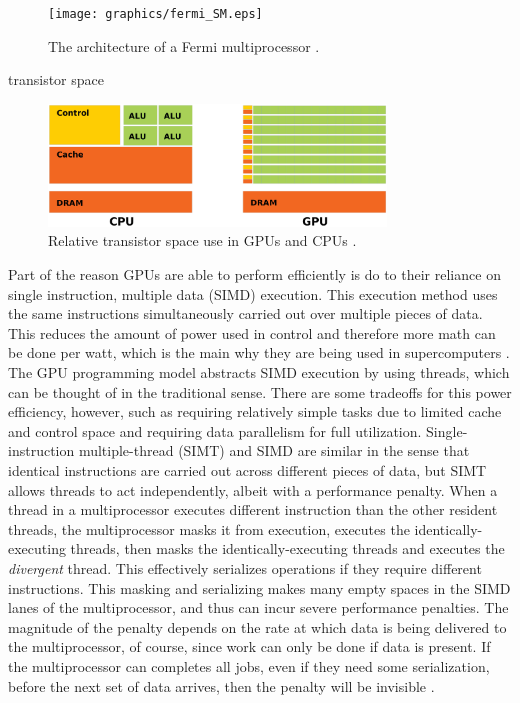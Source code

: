 \begin{figure}[h!] 
  \centering
    \texttt{[image: graphics/fermi\_SM.eps]}
     \caption{The architecture of a Fermi multiprocessor \cite{cuda}. \label{fermi_SM}}
\end{figure}

transistor space

\begin{figure}[h!] 
  \centering
    \includegraphics[width=0.8\textwidth]{graphics/CUDA_transistors.eps}
     \caption{Relative transistor space use in GPUs and CPUs \cite{cuda}. \label{cuda_transistors}}
\end{figure}

Part of the reason GPUs are able to perform efficiently is do to their reliance on single instruction, multiple data (SIMD) execution.  This execution method uses the same instructions simultaneously carried out over multiple pieces of data.  This reduces the amount of power used in control and therefore more math can be done per watt, which is the main why they are being used in supercomputers \cite{exascale}.  The GPU programming model abstracts SIMD execution by using threads, which can be thought of in the traditional sense. There are some tradeoffs for this power efficiency, however, such as requiring relatively simple tasks due to limited cache and control space and requiring data parallelism for full utilization.  Single-instruction multiple-thread (SIMT) and SIMD are similar in the sense that identical instructions are carried out across different pieces of data, but SIMT allows threads to act independently, albeit with a performance penalty.   When a thread in a multiprocessor executes different instruction than the other resident threads, the multiprocessor masks it from execution, executes the identically-executing threads, then masks the identically-executing threads and executes the \emph{divergent} thread.  This effectively serializes operations if they require different instructions.  This masking and serializing makes many empty spaces in the SIMD lanes of the multiprocessor, and thus can incur severe performance penalties.  The magnitude of the penalty depends on the rate at which data is being delivered to the multiprocessor, of course, since work can only be done if data is present.  If the multiprocessor can completes all jobs, even if they need some serialization, before the next set of data arrives, then the penalty will be invisible \cite{cuda}.

